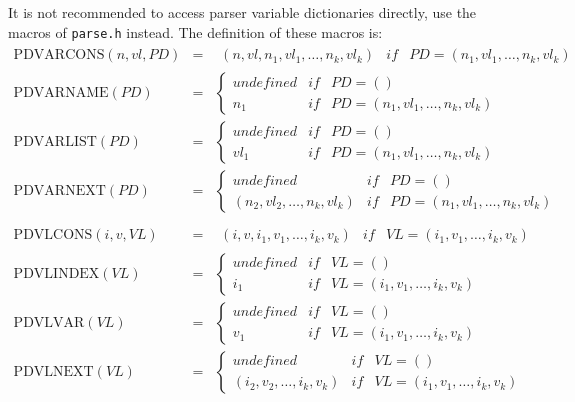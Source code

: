 It is not recommended to access parser variable dictionaries directly,
use the macros of {\tt parse.h} instead. The definition of these
macros is:
$$\begin{array}{rcl}
  \mbox{PDVARCONS}(n,vl,PD) & = & \begin{array}{lcl}
     (n,vl,n_1,vl_1,\dots,n_k,vl_k) & if & 
     PD = (n_1,vl_1,\dots,n_k,vl_k) \end{array} \\
  \mbox{PDVARNAME}(PD) & = & \left\{ \begin{array}{lcl}
     undefined & if & PD = () \\
     n_1 & if & PD = (n_1,vl_1,\dots,n_k,vl_k) \end{array}
   \right. \\
   \mbox{PDVARLIST}(PD) & = & \left\{ \begin{array}{lcl}
     undefined & if & PD = () \\
     vl_1 & if & PD = (n_1,vl_1,\dots,n_k,vl_k) \end{array}
   \right. \\
   \mbox{PDVARNEXT}(PD) & = & \left\{ \begin{array}{lcl}
     undefined & if & PD = () \\
     (n_2,vl_2,\dots,n_k,vl_k) & if & PD = (n_1,vl_1,\dots,n_k,vl_k)
   \end{array} \right. \\
   \\
  \mbox{PDVLCONS}(i,v,VL) & = & \begin{array}{lcl}
     (i,v,i_1,v_1,\dots,i_k,v_k) & if & 
     VL = (i_1,v_1,\dots,i_k,v_k) \end{array} \\
  \mbox{PDVLINDEX}(VL) & = & \left\{ \begin{array}{lcl}
     undefined & if & VL = () \\
     i_1 & if & VL = (i_1,v_1,\dots,i_k,v_k) \end{array}
   \right. \\
   \mbox{PDVLVAR}(VL) & = & \left\{ \begin{array}{lcl}
     undefined & if & VL = () \\
     v_1 & if & VL = (i_1,v_1,\dots,i_k,v_k) \end{array}
   \right. \\
   \mbox{PDVLNEXT}(VL) & = & \left\{ \begin{array}{lcl}
     undefined & if & VL = () \\
     (i_2,v_2,\dots,i_k,v_k) & if & VL = (i_1,v_1,\dots,i_k,v_k)
   \end{array} \right. \\   
\end{array}$$

